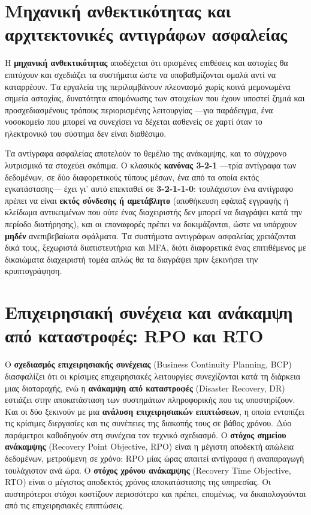 \section{Μηχανική ανθεκτικότητας και αρχιτεκτονικές αντιγράφων ασφαλείας}\label{sec:13.1}
Η \textbf{μηχανική ανθεκτικότητας} αποδέχεται ότι ορισμένες επιθέσεις και αστοχίες θα επιτύχουν και σχεδιάζει τα συστήματα ώστε να υποβαθμίζονται ομαλά αντί να καταρρέουν. Τα εργαλεία της περιλαμβάνουν πλεονασμό χωρίς κοινά μεμονωμένα σημεία αστοχίας, δυνατότητα απομόνωσης των στοιχείων που έχουν υποστεί ζημιά και προσχεδιασμένους τρόπους περιορισμένης λειτουργίας —για παράδειγμα, ένα νοσοκομείο που μπορεί να συνεχίσει να δέχεται ασθενείς σε χαρτί όταν το ηλεκτρονικό του σύστημα δεν είναι διαθέσιμο.

Τα αντίγραφα ασφαλείας αποτελούν το θεμέλιο της ανάκαμψης, και το σύγχρονο λυτρισμικό τα στοχεύει σκόπιμα. Ο κλασικός \textbf{κανόνας 3-2-1} —τρία αντίγραφα των δεδομένων, σε δύο διαφορετικούς τύπους μέσων, ένα από τα οποία εκτός εγκατάστασης— έχει γι' αυτό επεκταθεί σε \textbf{3-2-1-1-0}: τουλάχιστον ένα αντίγραφο πρέπει να είναι \textbf{εκτός σύνδεσης ή αμετάβλητο} (αποθήκευση εφάπαξ εγγραφής ή κλείδωμα αντικειμένων που ούτε ένας διαχειριστής δεν μπορεί να διαγράψει κατά την περίοδο διατήρησης), και οι επαναφορές πρέπει να δοκιμάζονται, ώστε να υπάρχουν \textbf{μηδέν} ανεπιβεβαίωτα σφάλματα. Τα συστήματα αντιγράφων ασφαλείας χρειάζονται δικά τους, ξεχωριστά διαπιστευτήρια και MFA, διότι διαφορετικά ένας επιτιθέμενος με δικαιώματα διαχειριστή τομέα απλώς θα τα διαγράψει πριν ξεκινήσει την κρυπτογράφηση.

\section{Επιχειρησιακή συνέχεια και ανάκαμψη από καταστροφές: RPO και RTO}\label{sec:13.2}
Ο \textbf{σχεδιασμός επιχειρησιακής συνέχειας} (Business Continuity Planning, BCP) διασφαλίζει ότι οι κρίσιμες επιχειρησιακές λειτουργίες συνεχίζονται κατά τη διάρκεια μιας διαταραχής, ενώ η \textbf{ανάκαμψη από καταστροφές} (Disaster Recovery, DR) εστιάζει στην αποκατάσταση των συστημάτων πληροφορικής που τις υποστηρίζουν. Και οι δύο ξεκινούν με μια \textbf{ανάλυση επιχειρησιακών επιπτώσεων}, η οποία εντοπίζει τις κρίσιμες διεργασίες και τις συνέπειες της διακοπής τους σε βάθος χρόνου. Δύο παράμετροι καθοδηγούν στη συνέχεια τον τεχνικό σχεδιασμό. Ο \textbf{στόχος σημείου ανάκαμψης} (Recovery Point Objective, RPO) είναι η μέγιστη αποδεκτή απώλεια δεδομένων, μετρούμενη σε χρόνο: RPO μίας ώρας απαιτεί αντίγραφα ή αναπαραγωγή τουλάχιστον ανά ώρα. Ο \textbf{στόχος χρόνου ανάκαμψης} (Recovery Time Objective, RTO) είναι ο μέγιστος αποδεκτός χρόνος αποκατάστασης της υπηρεσίας. Οι αυστηρότεροι στόχοι κοστίζουν περισσότερο και πρέπει, επομένως, να δικαιολογούνται από τις επιχειρησιακές επιπτώσεις.

